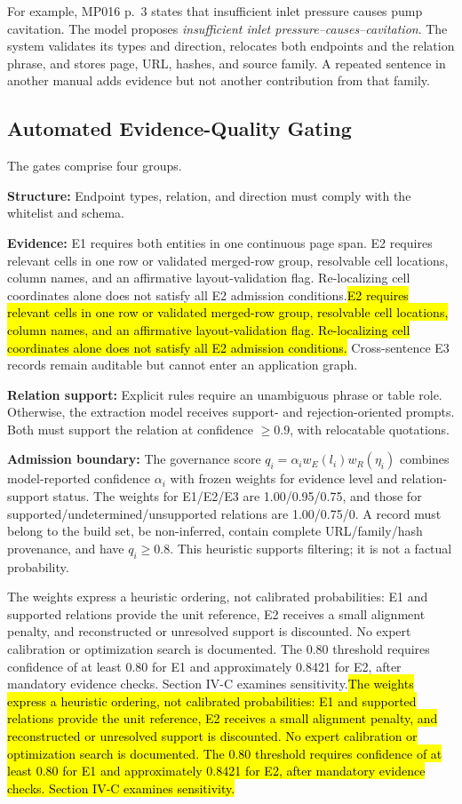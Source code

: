 \documentclass[conference,a4paper]{IEEEtran}
\DeclareRobustCommand{\rev}[1]{\ifdefined\CleanVersion#1\else\hl{#1}\fi}
\begin{document}
For example, MP016 p.~3 states that insufficient inlet pressure causes pump cavitation. The model proposes \emph{insufficient inlet pressure--causes--cavitation}. The system validates its types and direction, relocates both endpoints and the relation phrase, and stores page, URL, hashes, and source family. A repeated sentence in another manual adds evidence but not another contribution from that family.

\subsection{Automated Evidence-Quality Gating}

The gates comprise four groups.

\textbf{Structure:} Endpoint types, relation, and direction must comply with the whitelist and schema.

\textbf{Evidence:} E1 requires both entities in one continuous page span. \rev{E2 requires relevant cells in one row or validated merged-row group, resolvable cell locations, column names, and an affirmative layout-validation flag. Re-localizing cell coordinates alone does not satisfy all E2 admission conditions.} Cross-sentence E3 records remain auditable but cannot enter an application graph.

\textbf{Relation support:} Explicit rules require an unambiguous phrase or table role. Otherwise, the extraction model receives support- and rejection-oriented prompts. Both must support the relation at confidence $\geq0.9$, with relocatable quotations.

\textbf{Admission boundary:} The governance score $q_i=\alpha_i w_E(l_i)w_R(\eta_i)$ combines model-reported confidence $\alpha_i$ with frozen weights for evidence level and relation-support status. The weights for E1/E2/E3 are 1.00/0.95/0.75, and those for supported/undetermined/unsupported relations are 1.00/0.75/0. A record must belong to the build set, be non-inferred, contain complete URL/family/hash provenance, and have $q_i\geq0.8$. This heuristic supports filtering; it is not a factual probability.

\rev{The weights express a heuristic ordering, not calibrated probabilities: E1 and supported relations provide the unit reference, E2 receives a small alignment penalty, and reconstructed or unresolved support is discounted. No expert calibration or optimization search is documented. The 0.80 threshold requires confidence of at least 0.80 for E1 and approximately 0.8421 for E2, after mandatory evidence checks. Section IV-C examines sensitivity.}
\end{document}
